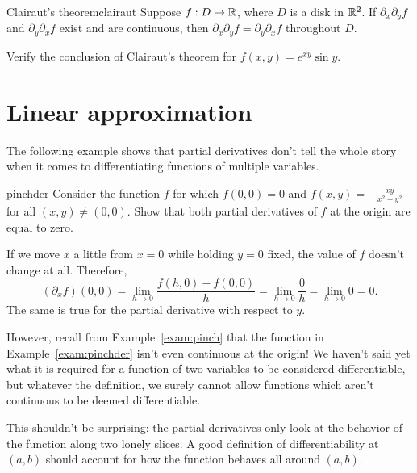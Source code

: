 \documentclass{watsonbook}
\begin{document}
\begin{theo}{Clairaut's theorem}{clairaut}
  Suppose $f:D \to \mathbb{R}$, where $D$ is a disk in $\mathbb{R}^2$. If
  $\partial_x \partial_y f$ and $\partial_y \partial_x f$ exist and
  are continuous, then $\partial_x \partial_y f = \partial_y
  \partial_x f$ throughout $D$. 
\end{theo}

\begin{exercise}{}{}
  Verify the conclusion of Clairaut's theorem for $f(x,y) = e^{xy}
  \sin y$. 
\end{exercise}

\section{Linear approximation} \label{sec:linapprox} 


The following example shows that partial derivatives don't tell the
whole story when it comes to differentiating functions of multiple
variables.

\begin{example}{}{pinchder}
  Consider the function $f$ for which $f(0,0)=0$ and $f(x,y) =
  -\frac{xy}{x^2 + y^2}$ for all $(x,y) \neq (0,0)$. Show that both
  partial derivatives of $f$ at the origin are equal to zero. 
  \end{example}

  \begin{solution}
    If we move $x$ a little from $x=0$ while holding $y=0$ fixed, the
    value of $f$ doesn't change at all. Therefore,
    \[
      (\partial_x f)(0,0) = \lim_{h \to 0} \frac{f(h,0) - f(0,0)}{h} =
      \lim_{h \to 0} \frac{0}{h} =  \lim_{h \to 0} 0 = 0. 
    \]
    The same is true for the partial derivative with respect to $y$. 
  \end{solution}

  However, recall from Example~\ref{exam:pinch} that the function in
  Example~\ref{exam:pinchder} isn't even continuous at the origin! We
  haven't said yet what it is required for a function of two variables to be
  considered differentiable, but whatever the definition, we surely cannot allow
  functions which aren't continuous to be deemed differentiable. 

  This shouldn't be surprising: the partial derivatives only look at
  the behavior of the function along two lonely slices. A good
  definition of differentiability at $(a,b)$ should account for how the
  function behaves all around $(a,b)$.
\end{document}
